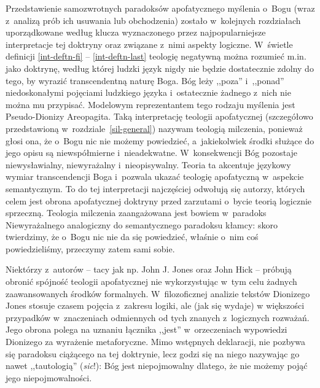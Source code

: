 Przedstawienie samozwrotnych paradoksów apofatycznego myślenia o~Bo\-gu (wraz z~analizą prób ich usuwania lub obchodzenia) zostało w~kolejnych rozdziałach uporządkowane według klucza wyznaczonego przez najpopularniejsze interpretacje tej doktryny oraz związane z~nimi aspekty logiczne. W~świetle definicji \ref{int-deftn-fi} -- \ref{int-deftn-last} teologię negatywną można rozumieć m.in. jako doktrynę, według której ludzki język nigdy nie będzie dostatecznie zdolny do tego, by wyrazić transcendentną naturę Boga. Bóg leży ,,poza'' i~,,ponad'' niedoskonałymi pojęciami ludzkiego języka i~ostatecznie żadnego z~nich nie można mu przypisać. Modelowym reprezentantem tego rodzaju myślenia jest Pseudo-Dionizy Areopagita. Taką interpretację teologii apofatycznej (szczegółowo przedstawioną w~rozdziale~\ref{sil-general}) nazywam teologią milczenia, ponieważ głosi ona, że o~Bogu nic nie możemy powiedzieć, a~jakiekolwiek środki służące do jego opisu są niewspółmierne i~nieadekwatne. W~konsekwencji Bóg pozostaje niewysławialny, niewyrażalny i~nieopisywalny. Teoria ta akcentuje językowy wymiar transcendencji Boga i~pozwala ukazać teologię apofatyczną w~aspekcie semantycznym. To do tej interpretacji najczęściej odwołują się autorzy, których celem jest obrona apofatycznej doktryny przed zarzutami o~bycie teorią logicznie sprzeczną. Teologia milczenia zaangażowana jest bowiem w~paradoks Niewyrażalnego analogiczny do semantycznego paradoksu kłamcy: skoro twierdzimy, że o~Bogu nic nie da się powiedzieć, właśnie o~nim coś powiedzieliśmy, przeczymy zatem sami sobie.

Niektórzy z~autorów -- tacy jak np. John J. Jones oraz John Hick -- próbują obronić spójność teologii apofatycznej nie wykorzystując w~tym celu żadnych zaawansowanych środków formalnych.
W~filozoficznej analizie tekstów Dionizego Jones stosuje czasem pojęcia z~zakresu logiki, ale (jak się wydaje) w większości przypadków w~znaczeniach odmiennych od tych znanych z~logicznych rozważań. Jego obrona polega na uznaniu łącznika ,,jest'' w~orzeczeniach wypowiedzi Dionizego za wyrażenie metaforyczne. Mimo wstępnych deklaracji, nie pozbywa się paradoksu ciążącego na tej doktrynie, lecz godzi się na niego nazywając go nawet ,,tautologią'' (\textit{sic}!): Bóg jest niepojmowalny dlatego, że nie możemy pojąć jego niepojmowalności.

